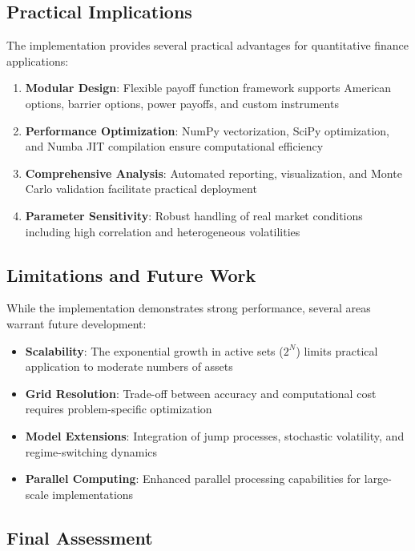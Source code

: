 \documentclass[11pt]{article}
\begin{document}
\subsection{Practical Implications}

The implementation provides several practical advantages for quantitative finance applications:

\begin{enumerate}
\item \textbf{Modular Design}: Flexible payoff function framework supports American options, barrier options, power payoffs, and custom instruments
\item \textbf{Performance Optimization}: NumPy vectorization, SciPy optimization, and Numba JIT compilation ensure computational efficiency
\item \textbf{Comprehensive Analysis}: Automated reporting, visualization, and Monte Carlo validation facilitate practical deployment
\item \textbf{Parameter Sensitivity}: Robust handling of real market conditions including high correlation and heterogeneous volatilities
\end{enumerate}

\subsection{Limitations and Future Work}

While the implementation demonstrates strong performance, several areas warrant future development:

\begin{itemize}
\item \textbf{Scalability}: The exponential growth in active sets ($2^N$) limits practical application to moderate numbers of assets
\item \textbf{Grid Resolution}: Trade-off between accuracy and computational cost requires problem-specific optimization
\item \textbf{Model Extensions}: Integration of jump processes, stochastic volatility, and regime-switching dynamics
\item \textbf{Parallel Computing}: Enhanced parallel processing capabilities for large-scale implementations
\end{itemize}

\subsection{Final Assessment}
\end{document}

